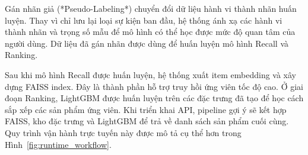Gán nhãn giả (*Pseudo-Labeling*) chuyển đổi dữ liệu hành vi thành nhãn huấn luyện. Thay vì chỉ lưu lại loại sự kiện ban đầu, hệ thống ánh xạ các hành vi thành nhãn và trọng số mẫu để mô hình có thể học được mức độ quan tâm của người dùng. Dữ liệu đã gán nhãn được dùng để huấn luyện mô hình Recall và Ranking.
\medskip

Sau khi mô hình Recall được huấn luyện, hệ thống xuất item embedding và xây dựng FAISS index. Đây là thành phần hỗ trợ truy hồi ứng viên tốc độ cao. Ở giai đoạn Ranking, LightGBM được huấn luyện trên các đặc trưng đã tạo để học cách sắp xếp các sản phẩm ứng viên. Khi triển khai API, pipeline gợi ý sẽ kết hợp FAISS, kho đặc trưng và LightGBM để trả về danh sách sản phẩm cuối cùng. Quy trình vận hành trực tuyến này được mô tả cụ thể hơn trong Hình~\ref{fig:runtime_workflow}.

